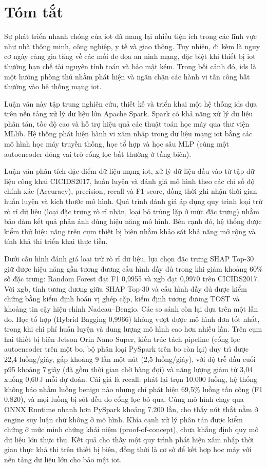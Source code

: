 \chapter*{Tóm tắt}
Sự phát triển nhanh chóng của \ac{iot} đã mang lại nhiều tiện ích trong các lĩnh vực như nhà thông minh, công nghiệp, y tế và giao thông. Tuy nhiên, đi kèm là nguy cơ ngày càng gia tăng về các mối đe dọa an ninh mạng, đặc biệt khi thiết bị \ac{iot} thường hạn chế tài nguyên tính toán và bảo mật kém. Trong bối cảnh đó, \ac{ids} là một hướng phòng thủ nhằm phát hiện và ngăn chặn các hành vi tấn công bất thường vào hệ thống mạng \ac{iot}.

Luận văn này tập trung nghiên cứu, thiết kế và triển khai một hệ thống \ac{ids} dựa trên nền tảng xử lý dữ liệu lớn Apache Spark. Spark có khả năng xử lý dữ liệu phân tán, tốc độ cao và hỗ trợ hiệu quả các thuật toán học máy qua thư viện MLlib. Hệ thống phát hiện hành vi xâm nhập trong dữ liệu mạng \ac{iot} bằng các mô hình học máy truyền thống, học tổ hợp và học sâu MLP (cùng một autoencoder đóng vai trò cổng lọc bất thường ở tầng biên).

Luận văn phân tích đặc điểm dữ liệu mạng \ac{iot}, xử lý dữ liệu đầu vào từ tập dữ liệu công khai CICIDS2017, huấn luyện và đánh giá mô hình theo các chỉ số độ chính xác (Accuracy), precision, recall và F1-score, đồng thời ghi nhận thời gian huấn luyện và kích thước mô hình. Quá trình đánh giá áp dụng quy trình loại trừ rò rỉ dữ liệu (loại đặc trưng rò rỉ nhãn, loại bỏ trùng lặp ở mức đặc trưng) nhằm bảo đảm kết quả phản ánh đúng hiệu năng mô hình. Bên cạnh đó, hệ thống được kiểm thử hiệu năng trên cụm thiết bị biên nhằm khảo sát khả năng mở rộng và tính khả thi triển khai thực tiễn.

Dưới cấu hình đánh giá loại trừ rò rỉ dữ liệu, lựa chọn đặc trưng SHAP Top-30 giữ được hiệu năng gần tương đương cấu hình đầy đủ trong khi giảm khoảng 60\% số đặc trưng: Random Forest đạt F1 0{,}9955 và \ac{xgb} đạt 0{,}9970 trên CICIDS2017. Với \ac{xgb}, tính tương đương giữa SHAP Top-30 và cấu hình đầy đủ được kiểm chứng bằng kiểm định hoán vị ghép cặp, kiểm định tương đương TOST và khoảng tin cậy hiệu chỉnh Nadeau--Bengio. Các so sánh còn lại dựa trên một lần đo. Học tổ hợp (Hybrid Bagging 0{,}9966) không vượt được mô hình đơn tốt nhất, trong khi chi phí huấn luyện và dung lượng mô hình cao hơn nhiều lần. Trên cụm hai thiết bị biên Jetson Orin Nano Super, kiến trúc tách pipeline (cổng lọc autoencoder trên một bo, bộ phân loại PySpark trên bo còn lại) duy trì được 22{,}4 luồng/giây, gấp khoảng 9 lần một nút (2{,}5 luồng/giây), với độ trễ đầu cuối p95 khoảng 7\,giây (đã gồm thời gian chờ hàng đợi) và năng lượng giảm từ 3{,}04 xuống 0{,}60\,J mỗi dự đoán. Cái giá là recall: phát lại trọn 10.000 luồng, hệ thống không báo nhầm luồng benign nào nhưng chỉ phát hiện 69{,}5\% luồng tấn công (F1 0{,}820), và mọi luồng bị sót đều do cổng lọc bỏ qua. Cùng mô hình chạy qua ONNX Runtime nhanh hơn PySpark khoảng 7.200 lần, cho thấy nút thắt nằm ở engine suy luận chứ không ở mô hình. Khía cạnh xử lý phân tán được kiểm chứng ở mức minh chứng khái niệm (proof-of-concept), chưa khẳng định quy mô dữ liệu lớn thực thụ. Kết quả cho thấy một quy trình phát hiện xâm nhập thời gian thực khả thi trên thiết bị biên, đồng thời là cơ sở để kết hợp học máy với nền tảng dữ liệu lớn cho bảo mật \ac{iot}.